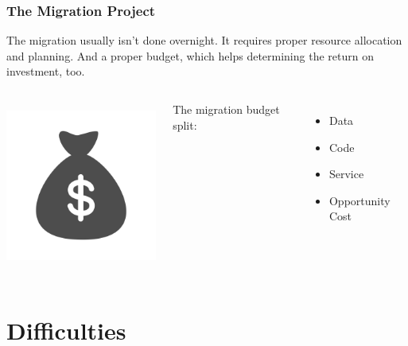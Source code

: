 \documentclass[xcolor=dvipsnames]{beamer}
\begin{document}
\begin{frame}[fragile]
  \frametitle{The Migration Project}

  The migration usually isn't done overnight. It requires proper resource
  allocation and planning. And a proper budget, which helps determining the
  return on investment, too.

  \vfill
  
  \begin{columns}[c]
    \begin{center}
      \includegraphics[height=15em]{budget.png}
    \end{center}

    The migration budget split:
    \begin{itemize}
    \item Data
    \item Code
    \item Service
    \item Opportunity Cost
    \end{itemize}
  \end{columns}
\end{frame}

\section{Difficulties}
\end{document}

